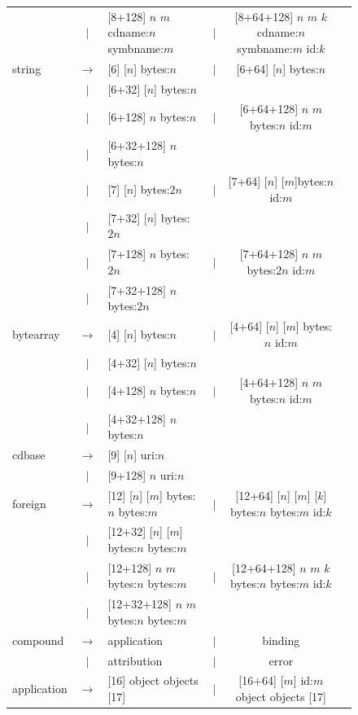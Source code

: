 \documentclass{report}
\begin{document}
\begin{figure}
\begin{center}
\begin{tabular}{lcp{6cm}lcp{5cm}}
       & $|$ & [8+128] {$n$} {$m$} cdname:$n$ symbname:$m$
       & $|$ & [8+64+128] {$n$} {$m$} {$k$} cdname:$n$ symbname:$m$ id:$k$\\
    string  & $\longrightarrow$& [6] [$n$] bytes:$n$
       & $|$ & [6+64] [$n$] bytes:$n$\\
       & $|$ & [6+32] [$n$] bytes:$n$ & & \\
       & $|$ & [6+128] {$n$} bytes:$n$
       & $|$ & [6+64+128] {$n$} {$m$} bytes:$n$ id:$m$\\
       & $|$ & [6+32+128] {$n$} bytes:$n$
       & & \\
       & $|$ & [7] [$n$] bytes:$2n$ 
       & $|$ & [7+64] [$n$] [$m$]bytes:$n$id:$m$ \\
       & $|$ & [7+32] [$n$] bytes:$2n$
       & & \\
       & $|$ & [7+128] {$n$} bytes:$2n$
       & $|$ & [7+64+128] {$n$} {$m$} bytes:$2n$ id:$m$\\
       & $|$ & [7+32+128] {$n$} bytes:$2n$ &&\\
   bytearray  & $\longrightarrow$& [4] [$n$] bytes:$n$
       & $|$ & [4+64] [$n$] [$m$] bytes:$n$ id:$m$\\
       & $|$ & [4+32] [$n$] bytes:$n$ && \\
       & $|$ & [4+128] {$n$} bytes:$n$
       & $|$ & [4+64+128] {$n$} {$m$} bytes:$n$ id:$m$\\
       & $|$ & [4+32+128] {$n$} bytes:$n$ && \\
    cdbase & $\longrightarrow$& [9] [$n$] uri:$n$ 
       &&\\
       & $|$ & [9+128] {$n$} uri:$n$ && \\
    foreign &$\longrightarrow$& [12] [$n$] [$m$] bytes:$n$ bytes:$m$
       & $|$ & [12+64] [$n$] [$m$] [$k$] bytes:$n$ bytes:$m$ id:$k$ \\
       & $|$ & [12+32] [$n$] [$m$] bytes:$n$ bytes:$m$ 
       &    & \\
       & $|$ & [12+128] {$n$} {$m$} bytes:$n$ bytes:$m$
       & $|$ & [12+64+128] {$n$} {$m$} {$k$} bytes:$n$ bytes:$m$ id:$k$\\
       & $|$ & [12+32+128] {$n$} {$m$} bytes:$n$ bytes:$m$
       &    &\\
   compound & $\longrightarrow$& application
      & $|$ & binding \\
      & $|$ & attribution
      & $|$ & error \\
   application & $\longrightarrow$ & [16] object objects [17] 
       & $|$ & [16+64] [$m$] id:$m$ object objects [17]\\

\end{tabular}
\end{center}
\end{figure}
\end{document}
